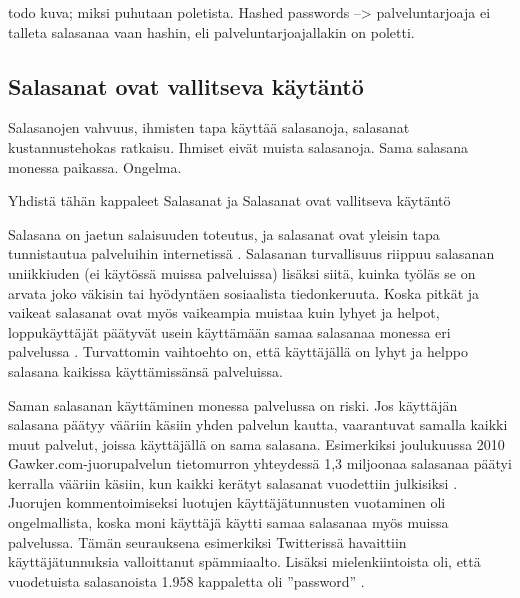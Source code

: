 \documentclass[finnish,gradu]{tktltiki}
\begin{document}
  todo kuva; miksi puhutaan poletista. Hashed passwords --> palveluntarjoaja ei talleta salasanaa vaan hashin, eli palveluntarjoajallakin on poletti.



  \subsection{Salasanat ovat vallitseva käytäntö} %
  \label{sub:salasanat}
  Salasanojen vahvuus, ihmisten tapa käyttää salasanoja, salasanat kustannustehokas ratkaisu.
  Ihmiset eivät muista salasanoja. Sama salasana monessa paikassa. Ongelma.

  Yhdistä tähän kappaleet Salasanat ja Salasanat ovat vallitseva käytäntö

  Salasana on jaetun salaisuuden toteutus, ja salasanat ovat yleisin tapa tunnistautua palveluihin internetissä \cite{study_of_passwords_07, passpet_06, password_management_strategies_06, pwdhash_extension_05}.
  Salasanan turvallisuus riippuu salasanan uniikkiuden (ei käytössä muissa palveluissa) lisäksi siitä, kuinka työläs se on arvata joko väkisin tai hyödyntäen sosiaalista tiedonkeruuta. Koska pitkät ja vaikeat salasanat ovat myös vaikeampia muistaa kuin lyhyet ja helpot, loppukäyttäjät päätyvät usein käyttämään samaa salasanaa monessa eri palvelussa \cite{study_of_passwords_07}. Turvattomin vaihtoehto on, että käyttäjällä on lyhyt ja helppo salasana kaikissa käyttämissänsä palveluissa.

  Saman salasanan käyttäminen monessa palvelussa on riski. Jos käyttäjän salasana päätyy vääriin käsiin yhden palvelun kautta, vaarantuvat samalla kaikki muut palvelut, joissa käyttäjällä on sama salasana. Esimerkiksi joulukuussa 2010 Gawker.com-juorupalvelun tietomurron yhteydessä 1,3 miljoonaa salasanaa päätyi kerralla vääriin käsiin, kun kaikki kerätyt salasanat vuodettiin julkisiksi \cite{bbc_gawker_12_2010, forbes_gawker_12_2010}. Juorujen kommentoimiseksi luotujen käyttäjätunnusten vuotaminen oli ongelmallista, koska moni käyttäjä käytti samaa salasanaa myös muissa palvelussa. Tämän seurauksena esimerkiksi Twitterissä havaittiin käyttäjätunnuksia valloittanut spämmiaalto. Lisäksi mielenkiintoista oli, että vuodetuista salasanoista 1.958 kappaletta oli ''password'' \cite{forbes_gawker_12_2010}.


\end{document}
